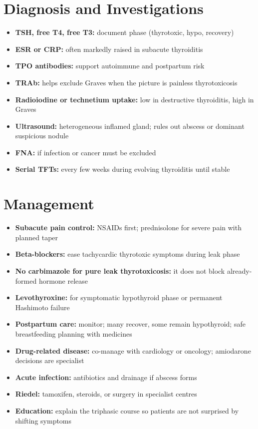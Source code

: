 \section*{Diagnosis and Investigations}
\begin{itemize}
    \item \textbf{TSH, free T4, free T3:} document phase (thyrotoxic, hypo, recovery)
    \item \textbf{ESR or CRP:} often markedly raised in subacute thyroiditis
    \item \textbf{TPO antibodies:} support autoimmune and postpartum risk
    \item \textbf{TRAb:} helps exclude Graves when the picture is painless thyrotoxicosis
    \item \textbf{Radioiodine or technetium uptake:} low in destructive thyroiditis, high in Graves
    \item \textbf{Ultrasound:} heterogeneous inflamed gland; rules out abscess or dominant suspicious nodule
    \item \textbf{FNA:} if infection or cancer must be excluded
    \item \textbf{Serial TFTs:} every few weeks during evolving thyroiditis until stable
\end{itemize}

\section*{Management}
\begin{itemize}
    \item \textbf{Subacute pain control:} NSAIDs first; prednisolone for severe pain with planned taper
    \item \textbf{Beta-blockers:} ease tachycardic thyrotoxic symptoms during leak phase
    \item \textbf{No carbimazole for pure leak thyrotoxicosis:} it does not block already-formed hormone release
    \item \textbf{Levothyroxine:} for symptomatic hypothyroid phase or permanent Hashimoto failure
    \item \textbf{Postpartum care:} monitor; many recover, some remain hypothyroid; safe breastfeeding planning with medicines
    \item \textbf{Drug-related disease:} co-manage with cardiology or oncology; amiodarone decisions are specialist
    \item \textbf{Acute infection:} antibiotics and drainage if abscess forms
    \item \textbf{Riedel:} tamoxifen, steroids, or surgery in specialist centres
    \item \textbf{Education:} explain the triphasic course so patients are not surprised by shifting symptoms
\end{itemize}

